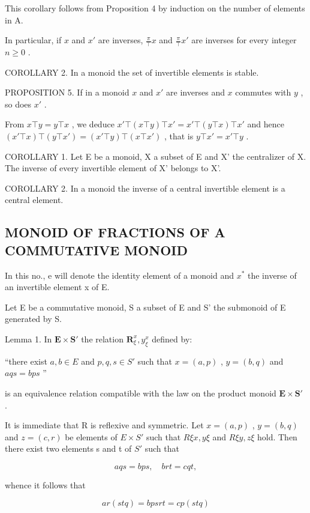 This corollary follows from Proposition 4 by induction on the number of elements in A.

In particular, if \(x\) and \(x'\) are inverses, \(\frac{\pi}{\top} x\) and \(\frac{\pi}{\top} x'\) are inverses for every integer \(n \geqslant 0\) .

COROLLARY 2. In a monoid the set of invertible elements is stable.

PROPOSITION 5. If in a monoid \(x\) and \(x'\) are inverses and \(x\) commutes with \(y\) , so does \(x'\) .

From \(x \top y = y \top x\) , we deduce \(x' \top (x \top y) \top x' = x' \top (y \top x) \top x'\) and hence \((x' \top x) \top (y \top x') = (x' \top y) \top (x \top x')\) , that is \(y \top x' = x' \top y\) .

COROLLARY 1. Let E be a monoid, X a subset of E and X' the centralizer of X. The inverse of every invertible element of X' belongs to X'.

COROLLARY 2. In a monoid the inverse of a central invertible element is a central element.

\subsection{MONOID OF FRACTIONS OF A COMMUTATIVE MONOID}

In this no., e will denote the identity element of a monoid and \(x^{*}\) the inverse of an invertible element x of E.

Let E be a commutative monoid, S a subset of E and S' the submonoid of E generated by S.

Lemma 1. In \(\mathbf{E} \times \mathbf{S}'\) the relation \(\mathbf{R}_{\xi}^{x}, y_{\xi}^{x}\) defined by:

``there exist \(a, b \in E\) and \(p, q, s \in S'\) such that \(x = (a, p)\) , \(y = (b, q)\) and \(aqs = bps\) ''

is an equivalence relation compatible with the law on the product monoid \(\mathbf{E} \times \mathbf{S}'\) .

It is immediate that R is reflexive and symmetric. Let \(x = (a, p)\) , \(y = (b, q)\) and \(z = (c, r)\) be elements of \(E \times S'\) such that \(R\xi x, y\xi\) and \(R\xi y, z\xi\) hold. Then there exist two elements s and t of \(S'\) such that

\[
a q s = b p s, \quad b r t = c q t,
\]

whence it follows that

\[
a r (s t q) = b p s r t = c p (s t q)
\]

